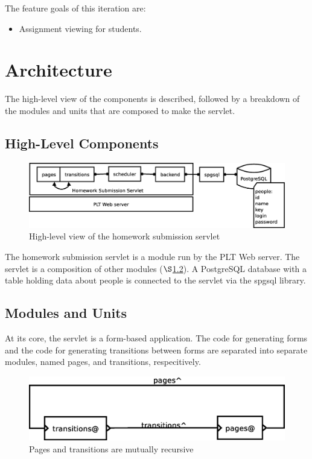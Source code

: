 \documentclass[a4paper]{article}
\begin{document}
The feature goals of this iteration are:

\begin{itemize}
\item{Assignment viewing for students.}
\end{itemize}

\section{Architecture}\label{sec:arch}

The high-level view of the components is described, followed by a breakdown of
the modules and units that are composed to make the servlet.

\subsection{High-Level Components}\label{subsec:high-level}

\begin{figure}[ht]
\centering
\includegraphics[scale=.35]{architecture.eps}
\caption{High-level view of the homework submission servlet}
\label{fig:architecture}
\end{figure}

The homework submission servlet is a module run by the PLT Web server. The
servlet is a composition of other modules ($\S$\ref{subsec:components}). A
PostgreSQL database with a table holding data about people is connected to the
servlet via the spgsql library.

\subsection{Modules and Units}\label{subsec:components}

At its core, the servlet is a form-based application. The code for generating 
forms and the code for generating transitions between forms are separated into 
separate modules, named pages, and transitions, respecitively.

\begin{figure}[ht]
\centering
\includegraphics[scale=.30]{units.eps}
\caption{Pages and transitions are mutually recursive}
\label{fig:layout}
\end{figure}
\end{document}
